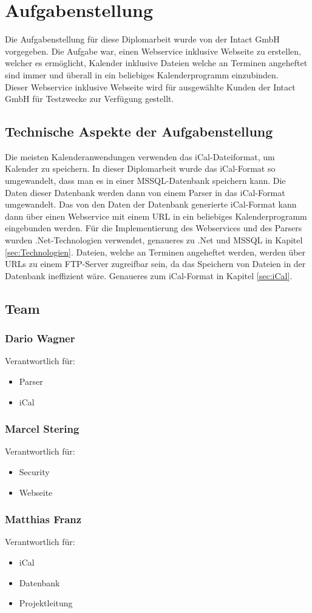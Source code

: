 \chapter{Aufgabenstellung}
\label{sec:Aufgabenstellung}
Die Aufgabenstellung für diese Diplomarbeit wurde von der Intact GmbH vorgegeben. Die Aufgabe war, einen Webservice inklusive Webseite zu erstellen, welcher es ermöglicht, Kalender inklusive Dateien welche an Terminen angeheftet sind immer und überall in ein beliebiges Kalenderprogramm einzubinden. \\
Dieser Webservice inklusive Webseite wird für ausgewählte Kunden der Intact GmbH für Testzwecke zur Verfügung gestellt. \\

\section{Technische Aspekte der Aufgabenstellung}
\label{sec:TechnischeAspekteDerAufgabenstellung}
Die meisten Kalenderanwendungen verwenden das iCal-Dateiformat, um Kalender zu speichern. In dieser Diplomarbeit wurde das iCal-Format so umgewandelt, dass man es in einer MSSQL-Datenbank speichern kann. Die Daten dieser Datenbank werden dann von einem Parser in das iCal-Format umgewandelt. Das von den Daten der Datenbank generierte iCal-Format kann dann über einen Webservice mit einem URL in ein beliebiges Kalenderprogramm eingebunden werden. Für die Implementierung des Webservices und des Parsers wurden .Net-Technologien verwendet, genaueres zu .Net und MSSQL in Kapitel \ref{sec:Technologien}.  Dateien, welche an Terminen angeheftet werden, werden über URLs zu einem FTP-Server zugreifbar sein, da das Speichern von Dateien in der Datenbank ineffizient wäre. Genaueres zum iCal-Format in Kapitel \ref{sec:iCal}.
\pagebreak

\section{Team}
\label{sec:Team}
	\subsection*{Dario Wagner}
		Verantwortlich für: 
		\begin{itemize}
			\item Parser
			\item iCal
		\end{itemize}
	\subsection*{Marcel Stering}
		Verantwortlich für: 
		\begin{itemize}
			\item Security
			\item Webseite
		\end{itemize}
	\subsection*{Matthias Franz}
		Verantwortlich für: 
		\begin{itemize}
			\item iCal
			\item Datenbank
			\item Projektleitung
		\end{itemize}	
\pagebreak			